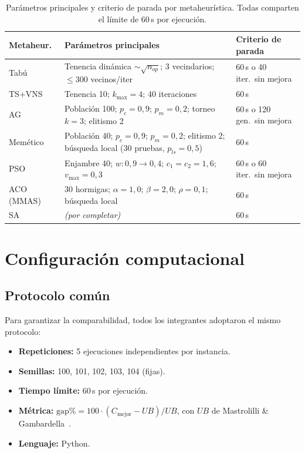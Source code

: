 \documentclass[conference]{IEEEtran}
\begin{document}
\begin{table}[!t]
\caption{Par\'ametros principales y criterio de parada por
metaheur\'istica. Todas comparten el l\'imite de 60\,s por ejecuci\'on.}
\label{tab:parametros}
\centering
\footnotesize
\setlength{\tabcolsep}{3pt}
\renewcommand{\arraystretch}{1.2}
\begin{tabular}{@{}p{1.3cm}p{4.0cm}p{1.7cm}@{}}
\toprule
\textbf{Metaheur.} & \textbf{Par\'ametros principales}
  & \textbf{Criterio de parada} \\
\midrule
Tab\'u & Tenencia din\'amica $\sim\!\sqrt{n_{op}}$; 3 vecindarios;
  $\leq$300 vecinos/iter & 60\,s o 40 iter.\ sin mejora \\
TS+VNS & Tenencia 10; $k_{\max}=4$; 40 iteraciones
  & 60\,s \\
AG & Poblaci\'on 100; $p_c=0{,}9$; $p_m=0{,}2$; torneo $k=3$;
  elitismo 2 & 60\,s o 120 gen.\ sin mejora \\
Mem\'etico & Poblaci\'on 40; $p_c=0{,}9$; $p_m=0{,}2$; elitismo 2;
  b\'usqueda local (30 pruebas, $p_{ls}=0{,}5$) & 60\,s \\
PSO & Enjambre 40; $w: 0{,}9\!\to\!0{,}4$; $c_1=c_2=1{,}6$;
  $v_{\max}=0{,}3$ & 60\,s o 60 iter.\ sin mejora \\
ACO (MMAS) & 30 hormigas; $\alpha=1{,}0$; $\beta=2{,}0$;
  $\rho=0{,}1$; b\'usqueda local & 60\,s \\
SA & \emph{(por completar)} & 60\,s \\
\bottomrule
\end{tabular}
\end{table}

\section{Configuraci\'on computacional}
\label{sec:experimento}

\subsection{Protocolo com\'un}

Para garantizar la comparabilidad, todos los integrantes adoptaron
el mismo protocolo:

\begin{itemize}
  \item \textbf{Repeticiones:} 5 ejecuciones independientes por
        instancia.
  \item \textbf{Semillas:} 100, 101, 102, 103, 104 (fijas).
  \item \textbf{Tiempo l\'imite:} 60\,s por ejecuci\'on.
  \item \textbf{M\'etrica:}
        $\text{gap\%} = 100 \cdot (C_{\text{mejor}} - UB)/UB$,
        con $UB$ de Mastrolilli \&
        Gambardella~\cite{mastrolilli2000}.
  \item \textbf{Lenguaje:} Python.
\end{itemize}
\end{document}
